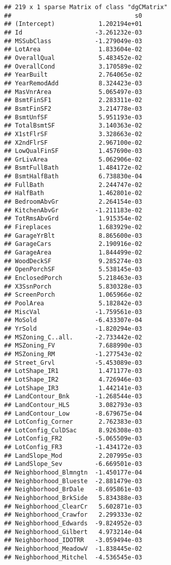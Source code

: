 \documentclass[
]{article}
\begin{document}
\begin{verbatim}
## 219 x 1 sparse Matrix of class "dgCMatrix"
##                                  s0
## (Intercept)            1.202194e+01
## Id                    -3.261232e-03
## MSSubClass            -1.279049e-03
## LotArea                1.833604e-02
## OverallQual            5.483452e-02
## OverallCond            3.170589e-02
## YearBuilt              2.764065e-02
## YearRemodAdd           8.324423e-03
## MasVnrArea             5.065497e-03
## BsmtFinSF1             2.283311e-02
## BsmtFinSF2             3.214778e-03
## BsmtUnfSF              5.951193e-03
## TotalBsmtSF            3.140363e-02
## X1stFlrSF              3.328663e-02
## X2ndFlrSF              2.967100e-02
## LowQualFinSF           1.457690e-03
## GrLivArea              5.062906e-02
## BsmtFullBath           1.484172e-02
## BsmtHalfBath           6.738830e-04
## FullBath               2.244747e-02
## HalfBath               1.462801e-02
## BedroomAbvGr           2.264154e-03
## KitchenAbvGr          -1.211183e-02
## TotRmsAbvGrd           1.915354e-02
## Fireplaces             1.683929e-02
## GarageYrBlt            8.865600e-03
## GarageCars             2.190916e-02
## GarageArea             1.844499e-02
## WoodDeckSF             9.285274e-03
## OpenPorchSF            5.538145e-03
## EnclosedPorch          5.218463e-03
## X3SsnPorch             5.830328e-03
## ScreenPorch            1.065966e-02
## PoolArea               5.182842e-03
## MiscVal               -1.759561e-03
## MoSold                -6.433307e-04
## YrSold                -1.820294e-03
## MSZoning_C..all.      -2.733442e-02
## MSZoning_FV            7.688990e-03
## MSZoning_RM           -1.277543e-02
## Street_Grvl           -5.453089e-03
## LotShape_IR1           1.471177e-03
## LotShape_IR2           4.726946e-03
## LotShape_IR3           1.442141e-03
## LandContour_Bnk       -1.268544e-03
## LandContour_HLS        3.082793e-03
## LandContour_Low       -8.679675e-04
## LotConfig_Corner       2.762383e-03
## LotConfig_CulDSac      8.926308e-03
## LotConfig_FR2         -5.065509e-03
## LotConfig_FR3         -1.434172e-03
## LandSlope_Mod          2.207995e-03
## LandSlope_Sev         -6.669501e-03
## Neighborhood_Blmngtn  -1.450177e-04
## Neighborhood_Blueste  -2.881479e-03
## Neighborhood_BrDale   -8.695861e-03
## Neighborhood_BrkSide   5.834388e-03
## Neighborhood_ClearCr   5.602871e-03
## Neighborhood_Crawfor   2.299333e-02
## Neighborhood_Edwards  -9.824952e-03
## Neighborhood_Gilbert   4.973214e-04
## Neighborhood_IDOTRR   -3.059494e-03
## Neighborhood_MeadowV  -1.838445e-02
## Neighborhood_Mitchel  -4.536545e-03

\end{verbatim}
\end{document}
